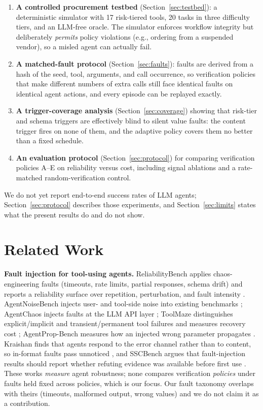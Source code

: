 \documentclass[conference]{IEEEtran}
\begin{document}
\begin{enumerate}
\item \textbf{A controlled procurement testbed} (Section~\ref{sec:testbed}): a deterministic
simulator with 17 risk-tiered tools, 20 tasks in three difficulty tiers, and an LLM-free
oracle. The simulator enforces workflow integrity but deliberately \emph{permits} policy
violations (e.g., ordering from a suspended vendor), so a misled agent can actually fail.
\item \textbf{A matched-fault protocol} (Section~\ref{sec:faults}): faults are derived from a
hash of the seed, tool, arguments, and call occurrence, so verification policies that make
different numbers of extra calls still face identical faults on identical agent actions,
and every episode can be replayed exactly.
\item \textbf{A trigger-coverage analysis} (Section~\ref{sec:coverage}) showing that
risk-tier and schema triggers are effectively blind to silent value faults: the content
trigger fires on none of them, and the adaptive policy covers them no better than a fixed
schedule.
\item \textbf{An evaluation protocol} (Section~\ref{sec:protocol}) for comparing verification
policies A--E on reliability versus cost, including signal ablations and a rate-matched
random-verification control.
\end{enumerate}

We do not yet report end-to-end success rates of LLM agents; Section~\ref{sec:protocol}
describes those experiments, and Section~\ref{sec:limits} states what the present results do
and do not show.

\section{Related Work}
\label{sec:related}

\textbf{Fault injection for tool-using agents.}
ReliabilityBench applies chaos-engineering faults (timeouts, rate limits, partial responses,
schema drift) and reports a reliability surface over repetition, perturbation, and fault
intensity \cite{gupta2026reliabilitybench}. AgentNoiseBench injects user- and tool-side noise
into existing benchmarks \cite{wang2026agentnoisebench}; AgentChaos injects faults at the LLM
API layer \cite{agentchaos2026}; ToolMaze distinguishes explicit/implicit and
transient/permanent tool failures and measures recovery cost \cite{zhu2026toolmaze};
AgentProp-Bench measures how an injected wrong parameter propagates \cite{gurram2026agentprop}.
Kraishan finds that agents respond to the error channel rather than to content, so
in-format faults pass unnoticed \cite{kraishan2026loud}, and SSCBench argues that fault-injection
results should report whether refuting evidence was available before first use
\cite{he2026sscbench}. These works \emph{measure} agent robustness; none compares verification
\emph{policies} under faults held fixed across policies, which is our focus. Our fault
taxonomy overlaps with theirs (timeouts, malformed output, wrong values) and we do not claim
it as a contribution.
\end{document}
